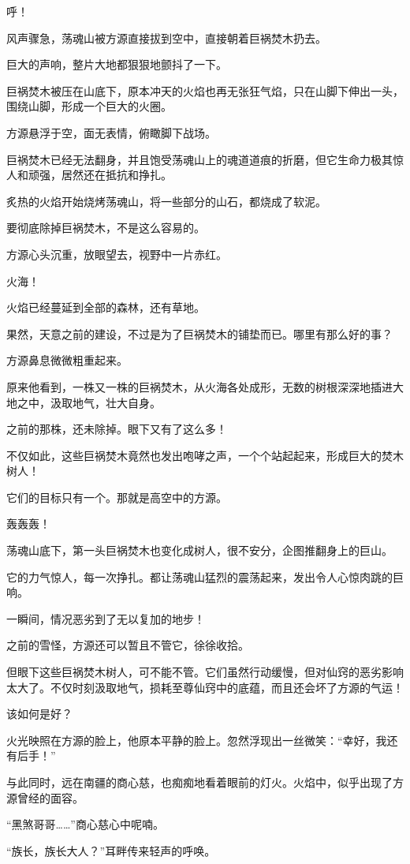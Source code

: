 \begin{this_body}
呼！

风声骤急，荡魂山被方源直接拔到空中，直接朝着巨祸焚木扔去。

巨大的声响，整片大地都狠狠地颤抖了一下。

巨祸焚木被压在山底下，原本冲天的火焰也再无张狂气焰，只在山脚下伸出一头，围绕山脚，形成一个巨大的火圈。

方源悬浮于空，面无表情，俯瞰脚下战场。

巨祸焚木已经无法翻身，并且饱受荡魂山上的魂道道痕的折磨，但它生命力极其惊人和顽强，居然还在抵抗和挣扎。

炙热的火焰开始烧烤荡魂山，将一些部分的山石，都烧成了软泥。

要彻底除掉巨祸焚木，不是这么容易的。

方源心头沉重，放眼望去，视野中一片赤红。

火海！

火焰已经蔓延到全部的森林，还有草地。

果然，天意之前的建设，不过是为了巨祸焚木的铺垫而已。哪里有那么好的事？

方源鼻息微微粗重起来。

原来他看到，一株又一株的巨祸焚木，从火海各处成形，无数的树根深深地插进大地之中，汲取地气，壮大自身。

之前的那株，还未除掉。眼下又有了这么多！

不仅如此，这些巨祸焚木竟然也发出咆哮之声，一个个站起起来，形成巨大的焚木树人！

它们的目标只有一个。那就是高空中的方源。

轰轰轰！

荡魂山底下，第一头巨祸焚木也变化成树人，很不安分，企图推翻身上的巨山。

它的力气惊人，每一次挣扎。都让荡魂山猛烈的震荡起来，发出令人心惊肉跳的巨响。

一瞬间，情况恶劣到了无以复加的地步！

之前的雪怪，方源还可以暂且不管它，徐徐收拾。

但眼下这些巨祸焚木树人，可不能不管。它们虽然行动缓慢，但对仙窍的恶劣影响太大了。不仅时刻汲取地气，损耗至尊仙窍中的底蕴，而且还会坏了方源的气运！

该如何是好？

火光映照在方源的脸上，他原本平静的脸上。忽然浮现出一丝微笑：“幸好，我还有后手！”

与此同时，远在南疆的商心慈，也痴痴地看着眼前的灯火。火焰中，似乎出现了方源曾经的面容。

“黑煞哥哥……”商心慈心中呢喃。

“族长，族长大人？”耳畔传来轻声的呼唤。


\end{this_body}

